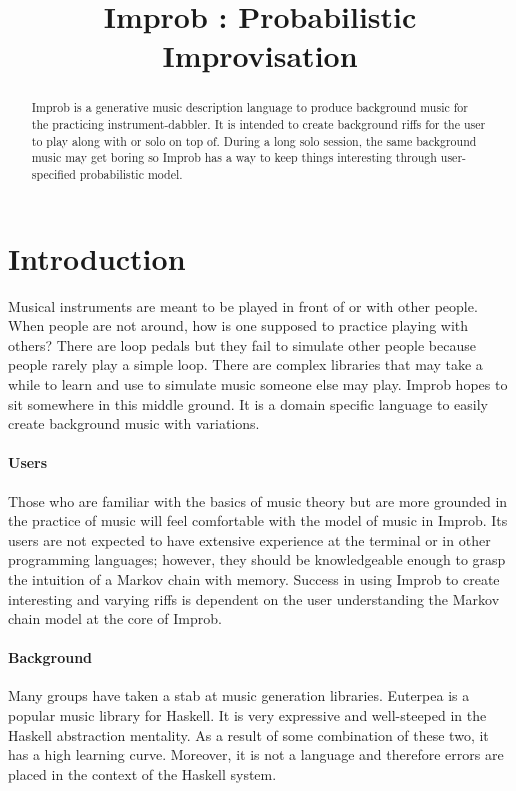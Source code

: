 \documentclass{sigplanconf-pldi15}
\begin{document}
%
%

\title{Improb : Probabilistic Improvisation}

\maketitle
\begin{abstract}
Improb is a generative music description language to produce background music for the practicing instrument-dabbler. It is intended to create background riffs for the user to play along with or solo on top of. During a long solo session, the same background music may get boring so Improb has a way to keep things interesting through user-specified probabilistic model.
\end{abstract}

\section{Introduction}
Musical instruments are meant to be played in front of or with other people. When people are not around, how is one supposed to practice playing with others? There are loop pedals but they fail to simulate other people because people rarely play a simple loop. There are complex libraries that may take a while to learn and use to simulate music someone else may play. Improb hopes to sit somewhere in this middle ground. It is a domain specific language to easily create background music with variations.

\paragraph{Users}
Those who are familiar with the basics of music theory but are more grounded in the practice of music will feel comfortable with the model of music in Improb. Its users are not expected to have extensive experience at the terminal or in other programming languages; however, they should be knowledgeable enough to grasp the intuition of a Markov chain with memory. Success in using Improb to create interesting and varying riffs is dependent on the user understanding the Markov chain model at the core of Improb.

\paragraph{Background}
Many groups have taken a stab at music generation libraries. Euterpea is a popular music library for Haskell. It is very expressive and well-steeped in the Haskell abstraction mentality. As a result of some combination of these two, it has a high learning curve. Moreover, it is not a language and therefore errors are placed in the context of the Haskell system.
\end{document}
